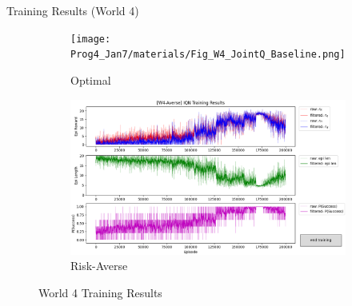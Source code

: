 \documentclass[aspectratio=1610, xcolor=dvipsnames]{packages/beamer}
\begin{document}
\begin{frame}{Training Results (World 4)}
     \begin{figure}
     \centering
          \begin{subfigure}[b]{\Wfig\textwidth}  \centering
              \texttt{[image: Prog4\_Jan7/materials/Fig\_W4\_JointQ\_Baseline.png]}
              \caption{Optimal} \label{fig:W4baseline}
          \end{subfigure}
          \hfill
         \begin{subfigure}[b]{\Wfig\textwidth} \centering
             \includegraphics[width=\textwidth]{../results/IDQN_W4/Fig_W4_JointQ_Averse}
             \caption{Risk-Averse} \label{fig:W4averse}
         \end{subfigure}
    \caption{World 4 Training Results}
    \label{fig:W4}
    \end{figure}
\end{frame}
\end{document}
